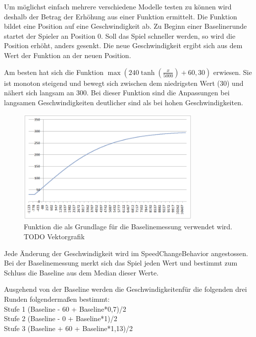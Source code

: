 \documentclass[a4paper,12pt]{scrartcl}
\begin{document}
Um möglichst einfach mehrere verschiedene Modelle testen zu können wird deshalb der
Betrag der Erhöhung aus einer Funktion ermittelt. Die Funktion bildet eine Position auf
eine Geschwindigkeit ab. Zu Beginn einer Baselinerunde startet der Spieler an Position
0. Soll das Spiel schneller werden, so wird die Position erhöht, anders gesenkt. Die neue
Geschwindigkeit ergibt sich aus dem Wert der Funktion an der neuen Position.

Am besten hat sich die Funktion $\max(240 \tanh(\frac{x}{5000})+60,
30)$ erwiesen. Sie ist monoton steigend und bewegt sich zwischen dem niedrigsten
Wert (30) und nähert sich langsam an 300. Bei dieser Funktion sind die Anpassungen 
bei langsamen Geschwindigkeiten deutlicher sind als bei hohen Geschwindigkeiten.

\begin{figure}[htp]
\begin{center}
  \includegraphics[width=0.8\textwidth]{BaselineFunktion.png}
  \caption[Grundlagenfunktion Baselinemessung]{Funktion die als Grundlage für
  die Baselinemessung verwendet wird.\\ TODO Vektorgrafik}
  \label{fig:BaselineFunktion}
\end{center}
\end{figure} 

Jede Änderung der Geschwindigkeit wird im SpeedChangeBehavior angestossen. Bei der
Baselinemessung merkt sich das Spiel jeden Wert und bestimmt zum Schluss die Baseline
aus dem Median dieser Werte.

Ausgehend von der Baseline werden die Geschwindigkeitenfür die folgenden drei Runden
folgendermaßen bestimmt:\\
Stufe 1 (Baseline - 60 + Baseline*0,7)/2\\
Stufe 2 (Baseline - 0 + Baseline*1)/2\\
Stufe 3 (Baseline + 60 + Baseline*1,13)/2\\
\end{document}
